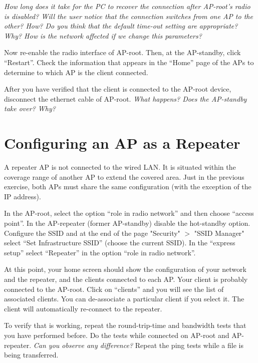 \emph{How long does it take for the PC to recover the connection after AP-root's radio is disabled?
Will the user notice that the connection switches from one AP to the other? How?
Do you think that the default time-out setting are appropriate? Why?
How is the network affected if we change this parameters?
}

Now re-enable the radio interface of AP-root.
Then, at the AP-standby, click ``Restart''.
Check the information that appears in the ``Home'' page of the APs to determine to which AP is the client connected.

After you have verified that the client is connected to the AP-root device, disconnect the ethernet cable of AP-root.
\emph{What happens? Does the AP-standby take over? Why?}

\section{Configuring an AP as a Repeater}

A repeater AP is not connected to the wired LAN.
It is situated within the coverage range of another AP to extend the covered area.
Just in the previous exercise, both APs must share the same configuration (with the exception of the IP address).

In the AP-root, select the option ``role in radio network'' and then choose ``access point''.
In the AP-repeater (former AP-standby) disable the hot-standby option.
Configure the SSID and at the end of the page "Security" $>$ "SSID Manager" select ``Set Infrastructure SSID'' (choose the current SSID).
In the ``express setup'' select ``Repeater'' in the option ``role in radio network''.

At this point, your home screen should show the configuration of your network and the repeater, and the clients connected to each AP.
Your client is probably connected to the AP-root.
Click on ``clients'' and you will see the list of associated clients.
You can de-associate a particular client if you select it.
The client will automatically re-connect to the repeater.

To verify that is working, repeat the round-trip-time and bandwidth tests that you have performed before.
Do the tests while connected on AP-root and AP-repeater.
\emph{Can you observe any difference?}
Repeat the ping tests while a file is being transferred.


